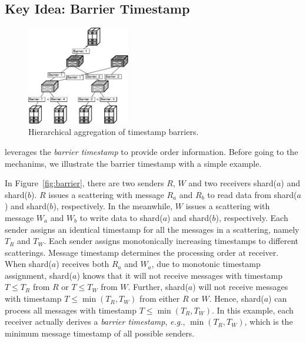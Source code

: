 

\subsection{Key Idea: Barrier Timestamp}
\label{sec:ideal}

\begin{figure}[t]
\centering
\includegraphics[width=0.4\textwidth]{images/hierarchical_merge.pdf}
\caption{Hierarchical aggregation of timestamp barriers.}
\label{fig:hierarchical_merge}
\vspace{-0.9em}
\end{figure}

\sys leverages the \emph{barrier timestamp} to provide order information. Before going to the mechanims, we illustrate the barrier timestamp with a simple example.

In Figure~\ref{fig:barrier}, there are two senders $R$, $W$ and two receivers shard($a$) and shard($b$). $R$ issues a scattering with message $R_a$ and $R_b$ to read data from shard($a$) and shard($b$), respectively. In the meanwhile, $W$ issues a scattering with message $W_a$ and $W_b$ to write data to shard($a$) and shard($b$), respectively. Each sender assigns an identical timestamp for all the messages in a scattering, namely $T_R$ and $T_W$. Each sender assigns monotonically increasing timestamps to different scatterings. Message timestamp determines the processing order at receiver. When shard($a$) receives both $R_a$ and $W_a$, due to monotonic timestamp assignment, shard($a$) knows that it will not receive messages with timestamp $T \le T_R$ from $R$ or $T \le T_W$ from $W$. Further, shard($a$) will not receive messages with timestamp $T \le \min(T_R, T_W)$ from either $R$ or $W$. Hence, shard($a$) can process all messages with timestamp $T \le \min(T_R, T_W)$. In this example, each receiver actually derives a \textit{barrier timestamp}, \textit{e.g.}, $\min(T_R, T_W)$, which is the minimum message timestamp of all possible senders.

